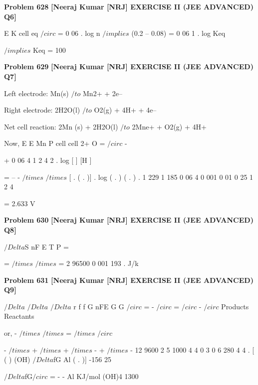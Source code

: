 \begin{problembox}
\textbf{Problem 628} \hfill \textbf{[Neeraj Kumar [NRJ] EXERCISE II (JEE ADVANCED) Q6]}
\label{q:ext-nrj_all_questions-628}

E
K
cell
eq
$/circ$
= 0 06
.
log
n
 $/implies$ (0.2 -- 0.08) = 0 06
1
.
log Keq 
 
 $/implies$ Keq = 100
\end{problembox}

\begin{problembox}
\textbf{Problem 629} \hfill \textbf{[Neeraj Kumar [NRJ] EXERCISE II (JEE ADVANCED) Q7]}
\label{q:ext-nrj_all_questions-629}

Left electrode: Mn(s) $/to$ Mn2+ + 2e-- 
 
 Right electrode: 2H2O(l) $/to$ O2(g) + 4H+ + 4e-- 
 
    Net cell reaction: 2Mn (s) + 2H2O(l) $/to$ 2Mne+ 
+ O2(g) + 4H+ 
 
 Now, E
E
Mn
P
cell
cell
2+
O
=
$/circ$
-
 
 
+
0 06
4
1
2
4
2
.
log
[
]
[H ]
 
 
                       =
--
-
$/times$
$/times$
[ .
(
.
)]
.
log
( .
)
( .
)
.
1 229
1 185
0 06
4
0 001
0 01
0 25
1
2
4
 
 
                         = 2.633 V
\end{problembox}

\begin{problembox}
\textbf{Problem 630} \hfill \textbf{[Neeraj Kumar [NRJ] EXERCISE II (JEE ADVANCED) Q8]}
\label{q:ext-nrj_all_questions-630}

$/Delta$S
nF
E
T
P
=
  
 
 
  
 
  
=
$/times$
$/times$
=
2
96500
0 001
193
.
J/k
\end{problembox}

\begin{problembox}
\textbf{Problem 631} \hfill \textbf{[Neeraj Kumar [NRJ] EXERCISE II (JEE ADVANCED) Q9]}
\label{q:ext-nrj_all_questions-631}

$/Delta$
  $/Delta$
  $/Delta$
r
f
f
G
nFE
G
G
$/circ$ = -
$/circ$ =
$/circ$
-
$/circ$
Products
Reactants 
 
 or, -
$/times$
$/times$
=
$/times$
$/circ$
 
  
 
  
-
$/times$
+
$/times$
+
$/times$ -
+
$/times$
-
12
9600
2 5
1000
4
4
0
3
0
6
280
4
4
.
[
(
)
(OH)
$/Delta$fG Al
(
.
)]
-156 25
 
 
   $/Delta$fG$/circ$
= -
-
Al
KJ/mol
(OH)4
1300
\end{problembox}

